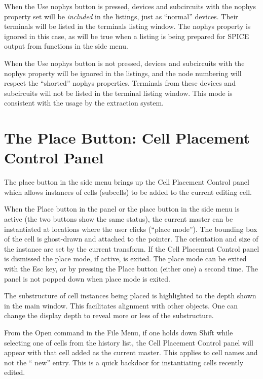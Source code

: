When the {\cb Use nophys} button is pressed, devices and subcircuits
with the {\et nophys} property set will be {\it included} in the
listings, just as ``normal'' devices.  Their terminals will be listed
in the terminals listing window.  The {\et nophys} property is ignored
in this case, as will be true when a listing is being prepared for
SPICE output from functions in the side menu.

When the {\cb Use nophys} button is not pressed, devices and
subcircuits with the {\et nophys} property will be ignored in the
listings, and the node numbering will respect the ``shorted'' {\et
nophys} properties.  Terminals from these devices and subcircuits will
not be listed in the terminal listing window.  This mode is consistent
with the usage by the extraction system.


\section{The {\cb Place} Button: Cell Placement Control Panel}

The {\cb place} button in the side menu brings up the {\cb Cell
Placement Control} panel which allows instances of cells (subcells) to
be added to the current editing cell.

When the {\cb Place} button in the panel or the {\cb place} button in
the side menu is active (the two buttons show the same status), the
current master can be instantiated at locations where the user clicks
(``place mode'').  The bounding box of the cell is ghost-drawn and
attached to the pointer.  The orientation and size of the instance are
set by the current transform.  If the {\cb Cell Placement Control}
panel is dismissed the place mode, if active, is exited.  The place
mode can be exited with the {\kb Esc} key, or by pressing the {\cb
Place} button (either one) a second time.  The panel is not popped
down when place mode is exited.

The substructure of cell instances being placed is highlighted to the
depth shown in the main window.  This facilitates alignment with other
objects.  One can change the display depth to reveal more or less of
the substructure.

From the {\cb Open} command in the {\cb File Menu}, if one holds down
{\kb Shift} while selecting one of cells from the history list, the
{\cb Cell Placement Control} panel will appear with that cell added as
the current master.  This applies to cell names and not the ``{\cb
new}'' entry.  This is a quick backdoor for instantiating cells
recently edited.

